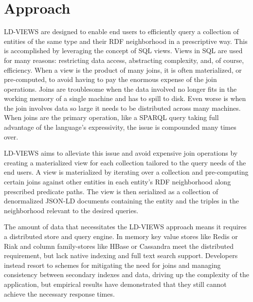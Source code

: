 \section{Approach}
\label{sec:approach}



LD-VIEWS are designed to enable end users to efficiently query a collection of entities of the same type and their RDF neighborhood in a prescriptive way.   
This is accomplished by leveraging the concept of SQL views.  
Views in SQL are used for many reasons: restricting data access, abstracting complexity, and, of course, efficiency. 
When a view is the product of many joins, it is often materialized, or pre-computed, to avoid having to pay the enormous expense of the join operations.  
Joins are troublesome when the data involved no longer fits in the working memory of a single machine and has to spill to disk.  
Even worse is when the join involves data so large it needs to be distributed across many machines.  
When joins are the primary operation, like a SPARQL query taking full advantage of the language's expressivity, the issue is compounded many times over.         

LD-VIEWS aims to alleviate this issue and avoid expensive join operations by creating a materialized view for each collection tailored to the query needs of the end users.  
A view is materialized by iterating over a collection and pre-computing certain joins against other entities in each entity's RDF neighborhood along prescribed predicate paths.  
The view is then serialized as a collection of denormalized JSON-LD documents containing the entity and the triples in the neighborhood relevant to the desired queries.  

The amount of data that necessitates the LD-VIEWS approach means it requires a distributed store and query engine.   
In memory key value stores like Redis or Riak and column family-stores like HBase or Cassandra meet the distributed requirement, but lack native indexing and full text search support.  
Developers instead resort to schemes for mitigating the need for joins and managing consistency between secondary indexes and data, driving up the complexity of the application, but empirical results have demonstrated that they still cannot achieve the necessary response times.   

